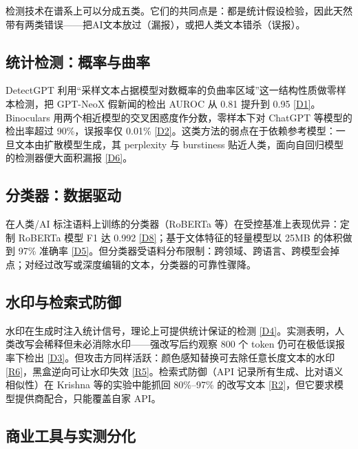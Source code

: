 \documentclass[10pt,a4paper]{ctexart}
\begin{document}
\begin{justifying}
检测技术在谱系上可以分成五类。它们的共同点是：都是统计假设检验，因此天然带有两类错误——把AI文本放过（漏报），或把人类文本错杀（误报）。

\subsection{统计检测：概率与曲率}

DetectGPT 利用“采样文本占据模型对数概率的负曲率区域”这一结构性质做零样本检测，把 GPT-NeoX 假新闻的检出 AUROC 从 0.81 提升到 0.95 \href{https://arxiv.org/abs/2301.11305}{[D1]}。Binoculars 用两个相近模型的交叉困惑度作分数，零样本下对 ChatGPT 等模型的检出率超过 90\%，误报率仅 0.01\% \href{https://arxiv.org/abs/2401.12070}{[D2]}。这类方法的弱点在于依赖参考模型：一旦文本由扩散模型生成，其 perplexity 与 burstiness 贴近人类，面向自回归模型的检测器便大面积漏报 \href{https://arxiv.org/abs/2507.10475}{[D6]}。

\subsection{分类器：数据驱动}

在人类/AI 标注语料上训练的分类器（RoBERTa 等）在受控基准上表现优异：定制 RoBERTa 模型 F1 达 0.992 \href{https://www.frontiersin.org/journals/artificial-intelligence/articles/10.3389/frai.2025.1458707/full}{[D8]}；基于文体特征的轻量模型以 25MB 的体积做到 97\% 准确率 \href{https://arxiv.org/abs/2511.21744}{[D5]}。但分类器受语料分布限制：跨领域、跨语言、跨模型会掉点；对经过改写或深度编辑的文本，分类器的可靠性骤降。

\subsection{水印与检索式防御}

水印在生成时注入统计信号，理论上可提供统计保证的检测 \href{https://arxiv.org/abs/2306.17439}{[D4]}。实测表明，人类改写会稀释但未必消除水印——强改写后约观察 800 个 token 仍可在极低误报率下检出 \href{https://arxiv.org/abs/2306.04634}{[D3]}。但攻击方同样活跃：颜色感知替换可去除任意长度文本的水印 \href{https://arxiv.org/abs/2403.14719}{[R6]}，黑盒逆向可让水印失效 \href{https://arxiv.org/abs/2411.05277}{[R5]}。检索式防御（API 记录所有生成、比对语义相似性）在 Krishna 等的实验中能抓回 80\%–97\% 的改写文本 \href{https://arxiv.org/abs/2303.13408}{[R2]}，但它要求模型提供商配合，只能覆盖自家 API。

\subsection{商业工具与实测分化}


\end{justifying}
\end{document}
